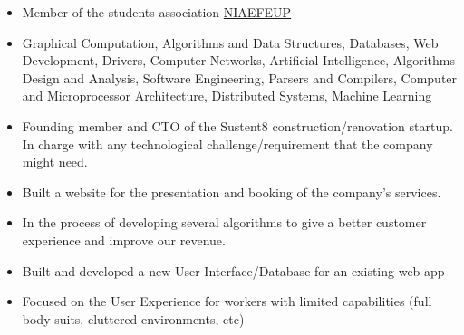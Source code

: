 \documentclass[8pt,a4paper]{altacv}
\begin{document}

\begin{fullwidth}
\makecvheader
\end{fullwidth}

\begin{itemize}
    \item  Member of the students association  \href{https://ni.fe.up.pt/}{NIAEFEUP \faExternalLink}
    \item Graphical Computation, Algorithms and Data Structures, Databases, Web Development, Drivers, Computer Networks, Artificial Intelligence, Algorithms Design and Analysis, Software Engineering, Parsers and Compilers, Computer and Microprocessor Architecture, Distributed Systems, Machine Learning
\end{itemize}


\begin{itemize}
\item Founding member and CTO of the Sustent8 construction/renovation startup. In charge with any technological challenge/requirement that the company might need.
\item Built a website for the presentation and booking of the company's services.
\item In the process of developing several algorithms to give a better customer experience and improve our revenue.
\end{itemize}

\vspace{2mm}

\begin{itemize}
\item Built and developed a new User Interface/Database for an existing web app
\item Focused on the User Experience for workers with limited capabilities (full body suits, cluttered environments, etc)
\end{itemize}
\end{document}
